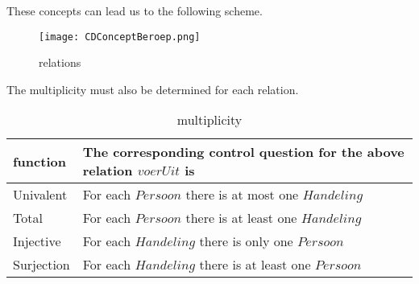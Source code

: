 These concepts can lead us to the following scheme.
\begin{figure}[H] 
\texttt{[image: CDConceptBeroep.png]}
\centering
\caption{relations}
\label{fig:relations}
\end{figure}
The multiplicity must also be determined for each relation.
\begin{table}[h!]
    \caption{multiplicity}
    \begin{tabular}{||l | l||} 
     \hline
    function & The corresponding control question for the above relation $voerUit$ is\\
    \hline\hline
        Univalent & For each $Persoon$ there is at most one $Handeling$\\ %
        Total & For each $Persoon$ there is at least one $Handeling$ \\ %
        Injective & For each $Handeling$ there is only one $Persoon$\\ %
        Surjection & For each $Handeling$ there is at least one $Persoon$\\ %
    \end{tabular}
    \label{tab:multiplicity}
\end{table}

